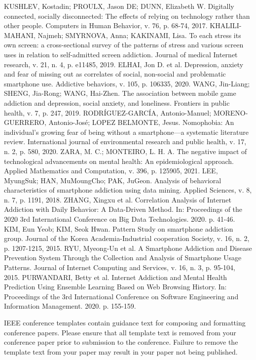 \documentclass[conference]{IEEEtran}
\begin{document}
\begin{thebibliography}{00}
 KUSHLEV, Kostadin; PROULX, Jason DE; DUNN, Elizabeth W. Digitally connected, socially disconnected: The effects of relying on technology rather than other people. Computers in Human Behavior, v. 76, p. 68-74, 2017.
 KHALILI-MAHANI, Najmeh; SMYRNOVA, Anna; KAKINAMI, Lisa. To each stress its own screen: a cross-sectional survey of the patterns of stress and various screen uses in relation to self-admitted screen addiction. Journal of medical Internet research, v. 21, n. 4, p. e11485, 2019.
 ELHAI, Jon D. et al. Depression, anxiety and fear of missing out as correlates of social, non-social and problematic smartphone use. Addictive behaviors, v. 105, p. 106335, 2020.
 WANG, Jin-Liang; SHENG, Jia-Rong; WANG, Hai-Zhen. The association between mobile game addiction and depression, social anxiety, and loneliness. Frontiers in public health, v. 7, p. 247, 2019.
 RODRÍGUEZ-GARCÍA, Antonio-Manuel; MORENO-GUERRERO, Antonio-José; LOPEZ BELMONTE, Jesus. Nomophobia: An individual’s growing fear of being without a smartphone—a systematic literature review. International journal of environmental research and public health, v. 17, n. 2, p. 580, 2020.
 ZARA, M. C.; MONTEIRO, L. H. A. The negative impact of technological advancements on mental health: An epidemiological approach. Applied Mathematics and Computation, v. 396, p. 125905, 2021.
 LEE, MyungSuk; HAN, MuMoungCho; PAK, JuGeon. Analysis of behavioral characteristics of smartphone addiction using data mining. Applied Sciences, v. 8, n. 7, p. 1191, 2018.
 ZHANG, Xingxu et al. Correlation Analysis of Internet Addiction with Daily Behavior: A Data-Driven Method. In: Proceedings of the 2020 3rd International Conference on Big Data Technologies. 2020. p. 41-46.
 KIM, Eun Yeob; KIM, Seok Hwan. Pattern Study on smartphone addiction group. Journal of the Korea Academia-Industrial cooperation Society, v. 16, n. 2, p. 1207-1215, 2015.
 RYU, Myeong-Un et al. A Smartphone Addiction and Disease Prevention System Through the Collection and Analysis of Smartphone Usage Patterns. Journal of Internet Computing and Services, v. 16, n. 3, p. 95-104, 2015.
 PURWANDARI, Betty et al. Internet Addiction and Mental Health Prediction Using Ensemble Learning Based on Web Browsing History. In: Proceedings of the 3rd International Conference on Software Engineering and Information Management. 2020. p. 155-159.

\end{thebibliography}
\vspace{12pt}
\color{red}
IEEE conference templates contain guidance text for composing and formatting conference papers. Please ensure that all template text is removed from your conference paper prior to submission to the conference. Failure to remove the template text from your paper may result in your paper not being published.
\end{document}
